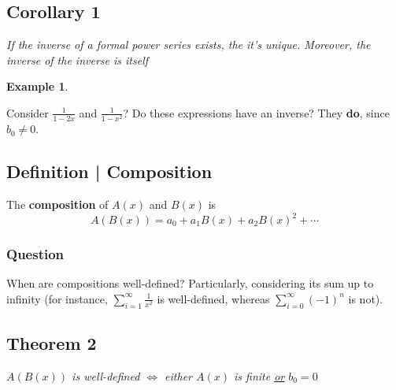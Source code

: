 \documentclass{report}
\newtheorem{ex}{Example}[section]
\begin{document}
\subsection{Corollary 1}
\begin{center}
\textit{If the inverse of a formal power series exists, the it's unique. Moreover, the inverse of the inverse is itself}
\end{center}
\begin{ex}
\end{ex}
Consider $\frac{1}{1-2x}$ and $\frac{1}{1-x^2}$? Do these expressions have an inverse? They \textbf{do}, since $b_0 \neq 0$.
\subsection{Definition | Composition}
The \textbf{composition} of $A(x)$ and $B(x)$ is $$A(B(x)) = a_0 + a_1B(x) + a_2B(x)^2 + \cdots$$
\subsubsection{Question}
When are compositions well-defined? Particularly, considering its sum up to infinity (for instance, $\displaystyle\sum_{i=1}^\infty \frac{1}{x^2}$ is well-defined, whereas $\displaystyle\sum_{i=0}^\infty (-1)^n$ is not).\\
\subsection{Theorem 2}
\begin{center}
\textit{$A(B(x))$ is well-defined $\iff$ either $A(x)$ is finite \underline{or} $b_0 = 0$}
\end{center}
\end{document}
